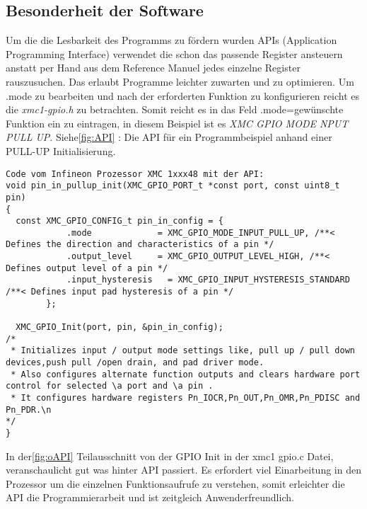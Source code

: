 \subsection{Besonderheit der Software}
Um die die Lesbarkeit des Programms zu fördern wurden APIs (Application Programming Interface) verwendet die schon das passende Register ansteuern anstatt per Hand aus dem Reference Manuel jedes einzelne Register rauszusuchen. Das erlaubt Programme leichter zuwarten und zu optimieren.
Um .mode zu bearbeiten und nach der erforderten Funktion zu konfigurieren reicht es die  \textit {xmc1-gpio.h} zu betrachten. Somit reicht es in das Feld .mode=gewünschte Funktion ein zu eintragen, in diesem Beispiel ist es \textit{XMC GPIO MODE NPUT PULL UP}.
Siehe\ref{fig:API} : Die API für ein Programmbeispiel anhand einer PULL-UP Initialisierung.
\\
\begin{minipage}{1\textwidth}
\begin{lstlisting}
Code vom Infineon Prozessor XMC 1xxx48 mit der API:
void pin_in_pullup_init(XMC_GPIO_PORT_t *const port, const uint8_t pin)
{
  const	XMC_GPIO_CONFIG_t pin_in_config = {
  			.mode             = XMC_GPIO_MODE_INPUT_PULL_UP, /**< Defines the direction and characteristics of a pin */
  			.output_level     = XMC_GPIO_OUTPUT_LEVEL_HIGH, /**< Defines output level of a pin */
  			.input_hysteresis	= XMC_GPIO_INPUT_HYSTERESIS_STANDARD /**< Defines input pad hysteresis of a pin */
  		};

  XMC_GPIO_Init(port, pin, &pin_in_config);
/*
 * Initializes input / output mode settings like, pull up / pull down devices,push pull /open drain, and pad driver mode.
 * Also configures alternate function outputs and clears hardware port control for selected \a port and \a pin .
 * It configures hardware registers Pn_IOCR,Pn_OUT,Pn_OMR,Pn_PDISC and Pn_PDR.\n
*/
}
\end{lstlisting}
\label{fig:API}
\end{minipage}

 In der\ref{fig:oAPI} Teilausschnitt von der GPIO Init in der xmc1 gpio.c Datei, veranschaulicht gut was hinter API passiert. Es erfordert viel Einarbeitung in den Prozessor um die einzelnen Funktionsaufrufe zu verstehen, somit erleichter die API die Programmierarbeit und ist zeitgleich Anwenderfreundlich.

